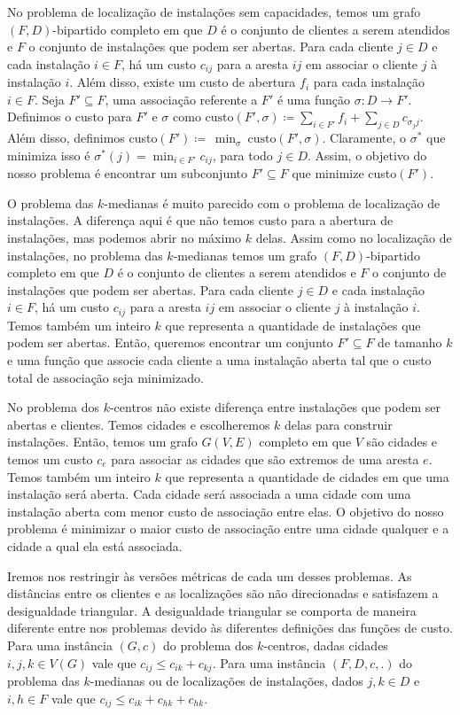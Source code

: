 \documentclass[12pt]{article}
\begin{document}
No problema de localização de instalações sem capacidades, temos um grafo $(F,D)$-bipartido completo em que $D$ é o conjunto de clientes a serem atendidos e $F$ o conjunto de instalações que podem ser abertas. Para cada cliente $j \in D$ e cada instalação $i \in F$, há um custo $c_{ij}$ para a aresta $ij$ em associar o cliente $j$ à instalação $i$. Além disso, existe um custo de abertura $f_i$ para cada instalação $i \in F$. Seja $F' \subseteq F$, uma associação referente a $F'$ é uma função $\sigma : D \to F'$. Definimos o custo para $F'$ e $\sigma$ como $\text{custo}(F',\sigma)\coloneqq \sum_{ i \in F'} f_i + \sum_{j \in D} c_{\sigma_{j}j}$. Além disso, definimos custo$(F') \coloneqq~\min_{\sigma}~\text{custo}(F',\sigma)$. Claramente, o $\sigma^*$ que minimiza isso é $\sigma^*(j) = \min_{i \in F'} c_{ij}$, para todo $j \in D$. Assim, o objetivo do nosso problema é encontrar um subconjunto $F' \subseteq F$ que minimize custo$(F')$.

O problema das $k$-medianas é muito parecido com o problema de localização de instalações. A diferença aqui é que não temos custo para a abertura de instalações, mas podemos abrir no máximo $k$ delas. 
Assim como no localização de instalações, no problema das $k$-medianas temos um grafo $(F,D)$-bipartido completo em que $D$ é o conjunto de clientes a serem atendidos e $F$ o conjunto de instalações que podem ser abertas. Para cada cliente $j \in D$ e cada instalação $i \in F$, há um custo $c_{ij}$ para a aresta $ij$ em associar o cliente $j$ à instalação $i$. Temos também um inteiro $k$ que representa a quantidade de instalações que podem ser abertas. Então, queremos encontrar um conjunto $F' \subseteq F$ de tamanho $k$ e uma função que associe cada cliente a uma instalação aberta tal que o custo total de associação seja minimizado.

No problema dos $k$-centros não existe diferença entre instalações que podem ser abertas e clientes. Temos cidades e escolheremos $k$ delas para construir instalações.
Então, temos um grafo $G(V,E)$ completo em que $V$ são cidades e temos um custo $c_{e}$ para associar as cidades que são extremos de uma aresta $e$. Temos também um inteiro $k$ que representa a quantidade de cidades em que uma instalação será aberta. Cada cidade será associada a uma cidade com uma instalação aberta com menor custo de associação entre elas. O objetivo do nosso problema é minimizar o maior custo de associação entre uma cidade qualquer e a cidade a qual ela está associada.

Iremos nos restringir às versões métricas de cada um desses problemas. As distâncias entre os clientes e as localizações são não direcionadas e satisfazem a desigualdade triangular. A desigualdade triangular se comporta de maneira diferente entre nos problemas devido às diferentes definições das funções de custo. Para uma instância $(G,c)$ do problema dos $k$-centros, dadas cidades $i,j,k \in V(G)$ vale que $ c_{ij} \leq c_{ik} + c_{kj}$. Para uma instância $(F,D,c,.)$ do problema das $k$-medianas ou de localizações de instalações, dados $j,k \in D$ e $i,h \in F$ vale que $c_{ij} \leq c_{ik} + c_{hk} + c_{hk}$.
\end{document}
